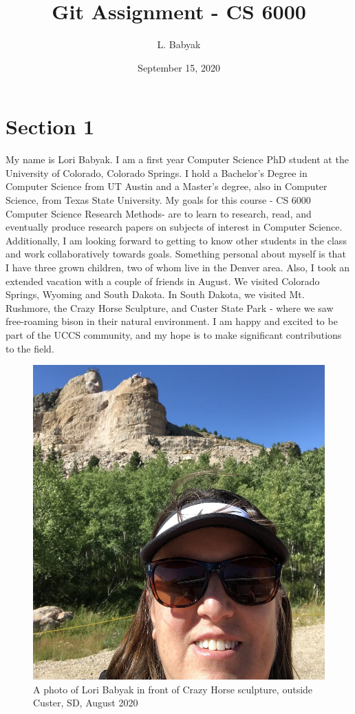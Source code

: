 \documentclass[letterpaper,12pt]{article}
\begin{document}
\title{Git Assignment - CS 6000}
\author{L. Babyak}
\date{September 15, 2020}
\maketitle

\section{Section 1}

My name is Lori Babyak.  I am a first year Computer Science PhD student at the University of Colorado, Colorado Springs. I hold a Bachelor's Degree in Computer Science from UT Austin and a Master's degree, also in Computer Science, from Texas State University. My goals for this course - CS 6000 Computer Science Research Methods- are to learn to research, read, and eventually produce research papers on subjects of interest in Computer Science. Additionally, I am looking forward to getting to know other students in the class and work collaboratively towards goals. Something personal about myself is that I have three grown children, two of whom live in the Denver area. Also, I took an extended vacation with a couple of friends in August. We visited Colorado Springs, Wyoming and South Dakota. In South Dakota, we visited Mt. Rushmore, the Crazy Horse Sculpture, and Custer State Park - where we saw free-roaming bison in their natural environment. I am happy and excited to be part of the UCCS community, and my hope is to make significant contributions to the field.

\begin{figure} [h!]
    \centering
    \includegraphics[width=.4\textwidth]{LoriSDSmall.JPG} 
    \caption{A photo of Lori Babyak in front of Crazy Horse sculpture, outside Custer, SD, August 2020}
\end{figure}
\end{document}
